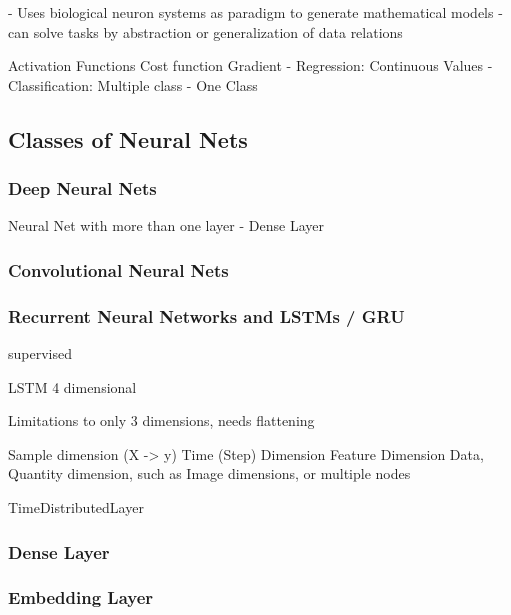 - Uses biological neuron systems as paradigm to generate mathematical models
- can solve tasks by abstraction or generalization of data relations


Activation Functions
Cost function
Gradient
- Regression: Continuous Values
- Classification: Multiple class
- One Class

\subsection{Classes of Neural Nets}
\label{subsec:classes-of-neural-nets}

\subsubsection{Deep Neural Nets}

Neural Net with more than one layer
- Dense Layer

\subsubsection{Convolutional Neural Nets}
\subsubsection{Recurrent Neural Networks and LSTMs / GRU}
supervised

LSTM 4 dimensional

Limitations to only 3 dimensions, needs flattening

Sample dimension (X -> y)
Time (Step) Dimension
Feature Dimension
Data, Quantity dimension, such as Image dimensions, or multiple nodes

TimeDistributedLayer

\subsubsection{Dense Layer}
\label{subsubsec:dense-layer}

\subsubsection{Embedding Layer}
\label{subsubsec:embedding-layer}

